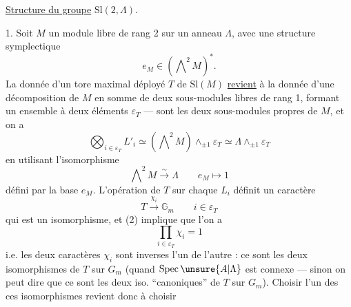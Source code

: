 \uline{Structure du groupe} $\mathrm{Sl}(2,\Lambda)$.

1. Soit $M$ un module libre de rang 2 sur un anneau $\Lambda$, avec une structure symplectique
\[
e_M\in(\bigwedge\nolimits^2M)^*.\tag*{(1)}
\]
La donnée d'un tore maximal déployé $T$ de $\mathrm{Sl}(M)$ \uline{revient} à la donnée d'une décomposition de $M$ en somme de deux sous-modules libres  de rang 1, formant un ensemble  à deux éléments $\varepsilon_T$ ---   sont les deux sous-modules propres de $M$, et on a
\[
\bigotimes_{i\in\varepsilon_T}L'_i\simeq(\bigwedge\nolimits^2M)\wedge_{\pm1}\varepsilon_T\simeq \Lambda\wedge_{\pm1}\varepsilon_T\tag*{(2)}
\]
en utilisant l'isomorphisme
\[
\bigwedge\nolimits^2 M\xrightarrow{\sim}\Lambda\qquad e_M\longmapsto 1\tag*{(3)}
\]
défini par la base $e_M$. L'opération de $T$ sur chaque $L_i$ définit un caractère
\[
T\xrightarrow{\chi_i}\mathbb G_m\qquad i\in\varepsilon_T\tag*{(4)}
\]
qui est un isomorphisme, et (2) implique que l'on a
\[
\prod_{i\in\varepsilon_T}\chi_i=1\tag*{(5)}
\]
i.e. les deux caractères $\chi_i$ sont inverses l'un de l'autre : ce sont les deux isomorphismes de $T$ sur $G_m$ (quand $\operatorname{Spec}\unsure{A|\Lambda}$ est connexe --- sinon on peut dire  que ce sont les deux iso. ``canoniques'' de $T$ sur $G_m$). Choisir l'un des ces isomorphismes revient donc à choisir
